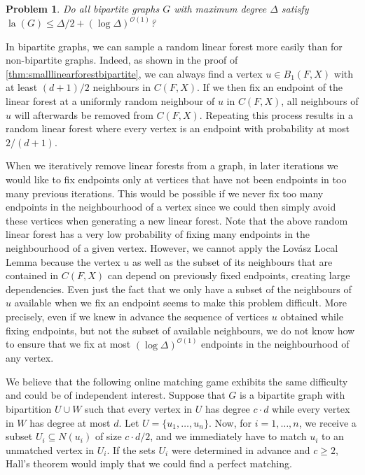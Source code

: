 \documentclass[11pt]{article}
\theoremstyle{plain}
\newtheorem{problem}[theorem]{Problem}
\theoremstyle{definition}
\newcommand{\cO}{\mathcal O}
\DeclareMathOperator{\la}{la}
\begin{document}
\begin{problem}
    Do all bipartite graphs $G$ with maximum degree $\Delta$ satisfy $\la(G) \le \Delta/2 + (\log \Delta)^{\cO(1)}$?
\end{problem}

In bipartite graphs, we can sample a random linear forest more easily than for non-bipartite graphs. Indeed, as shown in the proof of \cref{thm:smalllinearforestbipartite}, we can always find a vertex $u \in B_1(F,X)$ with at least $(d+1)/2$ neighbours in $C(F,X)$. If we then fix an endpoint of the linear forest at a uniformly random neighbour of $u$ in $C(F,X)$, all neighbours of $u$ will afterwards be removed from $C(F,X)$. Repeating this process results in a random linear forest where every vertex is an endpoint with probability at most $2/(d+1)$.

When we iteratively remove linear forests from a graph, in later iterations we would like to fix endpoints only at vertices that have not been endpoints in too many previous iterations. This would be possible if we never fix too many endpoints in the neighbourhood of a vertex since we could then simply avoid these vertices when generating a new linear forest. Note that the above random linear forest has a very low probability of fixing many endpoints in the neighbourhood of a given vertex. However, we cannot apply the Lov\'asz Local Lemma because the vertex $u$ as well as the subset of its neighbours that are contained in $C(F,X)$ can depend on previously fixed endpoints, creating large dependencies. Even just the fact that we only have a subset of the neighbours of $u$ available when we fix an endpoint seems to make this problem difficult. More precisely, even if we knew in advance the sequence of vertices $u$ obtained while fixing endpoints, but not the subset of available neighbours, we do not know how to ensure that we fix at most $(\log \Delta)^{\cO(1)}$ endpoints in the neighbourhood of any vertex.

We believe that the following online matching game exhibits the same difficulty and could be of independent interest. Suppose that $G$ is a bipartite graph with bipartition $U \cup W$ such that every vertex in $U$ has degree $c \cdot d$ while every vertex in $W$ has degree at most $d$. Let $U = \{u_1, \dots, u_n\}$. Now, for $i = 1, \dots, n$, we receive a subset $U_i \subseteq N(u_i)$ of size $c \cdot d / 2$, and we immediately have to match $u_i$ to an unmatched vertex in $U_i$. If the sets $U_i$ were determined in advance and $c \ge 2$, Hall's theorem would imply that we could find a perfect matching.
\end{document}
